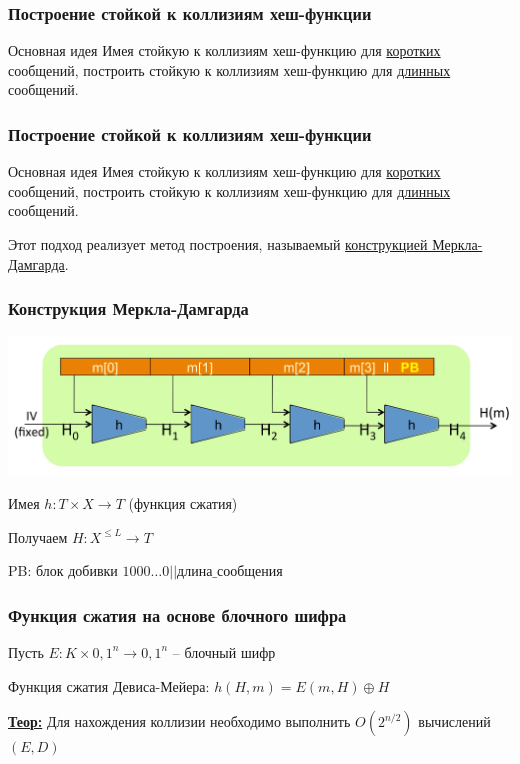 \documentclass{beamer}
\newcommand{\theorema}[1]{{\textbf{\underline{Теор:}} #1}}
\begin{document}

\begin{frame}
  \frametitle{Построение стойкой к коллизиям хеш-функции}

  \begin{block}{Основная идея}
  Имея стойкую к коллизиям хеш-функцию для \underline{коротких}
  сообщений, построить стойкую к коллизиям хеш-функцию для \underline{длинных}
  сообщений.
  \end{block}
\end{frame}

\begin{frame}
  \frametitle{Построение стойкой к коллизиям хеш-функции}

  \begin{block}{Основная идея}
  Имея стойкую к коллизиям хеш-функцию для \underline{коротких}
  сообщений, построить стойкую к коллизиям хеш-функцию для \underline{длинных}
  сообщений.
  \end{block}

  \vspace{8mm}
  Этот подход реализует метод построения, называемый \underline{конструкцией Меркла-Дамгарда}.
\end{frame}

\begin{frame}
  \frametitle{Конструкция Меркла-Дамгарда}

  \includegraphics[width=\linewidth]{./images/png/merkle_damgrand.png}

  \vspace{8mm}
  Имея $h: T \times X \rightarrow T$ (функция сжатия)

  \vspace{8mm}
  Получаем $H: X^{\leq L} \rightarrow T$

  \vspace{8mm}
  PB: блок добивки $1000 \ldots 0 || \text{длина\_сообщения}$
\end{frame}

\begin{frame}
  \frametitle{Функция сжатия на основе блочного шифра}

  Пусть $E:K \times {0,1}^{n} \rightarrow {0,1}^{n}$ -- блочный шифр

  \vspace{8mm}
  Функция сжатия Девиса-Мейера: $h(H,m) = E(m,H) \oplus H$

  \vspace{8mm}
  \theorema{Для нахождения коллизии необходимо выполнить $O(2^{n/2})$ вычислений $(E,D)$}
\end{frame}
\end{document}
